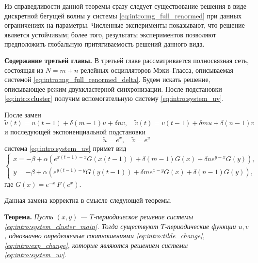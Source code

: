 Из справедливости данной теоремы сразу следует существование решения в виде дискретной бегущей волны у системы \eqref{eq:intro:mg_full_renormed} при данных ограничениях на параметры. Численные эксперименты показывают, что решение является устойчивым; более того, результаты экспериментов позволяют предположить глобальную притягиваемость решений данного вида.

\bigskip

\textbf{Содержание третьей главы.} В третьей главе рассматривается полносвязная сеть, состоящая из $N = m + n$ релейных осцилляторов Мэки--Гласса, описываемая системой \eqref{eq:intro:mg_full_renormed_delta}. Будем искать решение, описывающее режим двухкластерной синхронизации. После подстановки \eqref{eq:intro:cluster} получим вспомогательную систему \eqref{eq:intro:system_uv}.

После замен
\begin{equation}
	\label{eq:intro:tilde_change}
	\tilde{u}(t) = u(t - 1) + \delta (m - 1) u + \delta n v, \quad \tilde{v}(t) = v(t - 1) + \delta m u + \delta (n - 1) v
\end{equation}
%
и последующей экспоненциальной подстановки
\begin{equation}
	\label{eq:intro:exp_change}
	\tilde{u} = e^x, \quad \tilde{v} = e^y
\end{equation}
%
система \eqref{eq:intro:system_uv} примет вид
%
\begin{equation}
	\label{eq:intro:system_cluster_main}
	\begin{cases}
		\dot{x} = -\beta + \alpha \left(e^{x(t - 1) - x} G(x(t - 1)) + \delta (m - 1) G(x) + \delta n e^{y - x} G(y)\right),\\
		\dot{y} = -\beta + \alpha \left(e^{y(t - 1) - y} G(y(t - 1)) + \delta m e^{x - y} G(x) + \delta (n - 1) G(y)\right),
	\end{cases}
\end{equation}
где $G(x) = e^{-x} \, F(e^x)$.

Данная замена корректна в смысле следующей теоремы.

\textbf{Теорема.} \textit{Пусть $(x, y)$ --- $T$-периодическое решение системы \eqref{eq:intro:system_cluster_main}. Тогда существуют $T$-периодические функции $u, v$, однозначно определяемые соотношениями \eqref{eq:intro:tilde_change}, \eqref{eq:intro:exp_change}, которые являются решением системы \eqref{eq:intro:system_uv}.}

